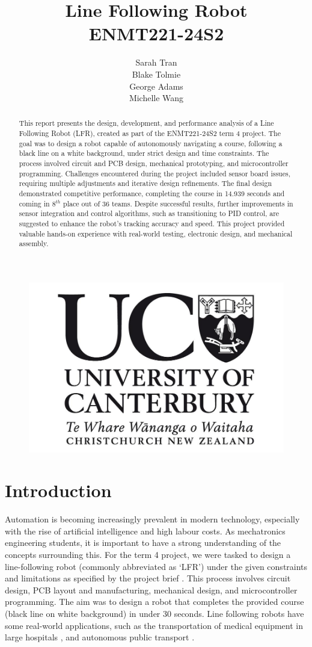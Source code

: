 \documentclass{article}
\title{%
  \textbf{Line Following Robot} \\
  \large{ENMT221-24S2} \\}
\author{Sarah Tran \\Blake Tolmie \\George Adams \\Michelle Wang }
\begin{document}
\begin{figure}
\centering
\includegraphics[width=0.4\linewidth]{REPORT/uclogov3.jpeg}
\end{figure}

\maketitle

\newpage
\begin{abstract}
This report presents the design, development, and performance analysis of a Line Following Robot (LFR), created as part of the ENMT221-24S2 term 4 project. The goal was to design a robot capable of autonomously navigating a course, following a black line on a white background, under strict design and time constraints. The process involved circuit and PCB design, mechanical prototyping, and microcontroller programming. Challenges encountered during the project included sensor board issues, requiring multiple adjustments and iterative design refinements. The final design demonstrated competitive performance, completing the course in 14.939 seconds and coming in $8^{th}$ place out of 36 teams. Despite successful results, further improvements in sensor integration and control algorithms, such as transitioning to PID control, are suggested to enhance the robot's tracking accuracy and speed. This project provided valuable hands-on experience with real-world testing, electronic design, and mechanical assembly.
\end{abstract}

\newpage
\tableofcontents

\newpage
\section{Introduction}
Automation is becoming increasingly prevalent in modern technology, especially with the rise of artificial intelligence and high labour costs. As mechatronics engineering students, it is important to have a strong understanding of the concepts surrounding this. For the term 4 project, we were tasked to design a line-following robot (commonly abbreviated as ‘LFR’) under the given constraints and limitations as specified by the project brief \cite{enmt221_lfr2024}. This process involves circuit design, PCB layout and manufacturing, mechanical design, and microcontroller programming. The aim was to design a robot that completes the provided course (black line on white background) in under 30 seconds. Line following robots have some real-world applications, such as the transportation of medical equipment in large hospitals \cite{kumaresan2017line}, and autonomous public transport \cite{gumus2016line}.  
\end{document}
